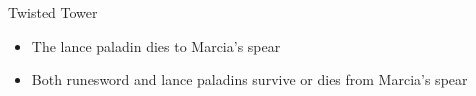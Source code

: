 \begin{battle}{Twisted Tower}
\begin{multicols}{2}
\begin{enumerate}
{\begin{itemize}
{                \begin{itemize}
                    \item The lance paladin dies to Marcia’s spear
                    \item Both runesword and lance paladins survive or dies from Marcia’s spear
                \end{itemize}
}
    \end{itemize}
}
\end{enumerate}
\end{multicols}
\end{battle}